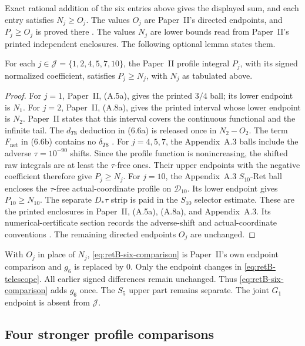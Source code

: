 Exact rational addition of the six entries above gives the displayed
sum, and each entry satisfies $N_j\ge O_j$.
The values $O_j$ are Paper~II's directed endpoints, and $P_j\ge O_j$ is
proved there \cite[(A.4), (A.5a), (A.8), (A.8a), Appendix~A.2--A.6]{PaperII}.
The values $N_j$ are lower bounds read from Paper~II's printed independent
enclosures. The following optional lemma states them.
\begin{lemma}
\label{lem:retB-six-endpoints}
For each $j\in\mathcal J=\{1,2,4,5,7,10\}$, the Paper~II profile integral
$P_j$, with its signed normalized coefficient, satisfies $P_j\ge N_j$,
with $N_j$ as tabulated above.
\end{lemma}
\begin{proof}
For $j=1$, Paper~II, (A.5a), gives the printed $3/4$ ball; its lower endpoint
is $N_1$. For $j=2$, Paper~II, (A.8a), gives the printed interval whose
lower endpoint is $N_2$. Paper~II states that this interval covers the continuous functional and the infinite
tail. The $d_{T8}$ deduction in (6.6a) is released once in $N_2-O_2$.
The term $F_{\mathrm{net}}$ in (6.6b) contains no $\delta_{T8}$
\cite[(6.6a)--(6.6b)]{PaperII}. For $j=4,5,7$, the Appendix~A.3 balls
include the adverse $\tau=10^{-90}$ shifts. Since the profile function is
nonincreasing, the shifted raw integrals are at least the $\tau$-free ones.
Their upper endpoints with the negative coefficient therefore give
$P_j\ge N_j$. For $j=10$, the Appendix~A.3 $S_{10}$-Ret ball encloses the
$\tau$-free actual-coordinate profile on $\mathcal D_{10}$. Its lower
endpoint gives $P_{10}\ge N_{10}$. The separate $D_*\tau$ strip is paid in
the $S_{10}$ selector estimate. These are the printed enclosures in Paper~II,
(A.5a), (A.8a), and Appendix~A.3. Its numerical-certificate section records
the adverse-shift and actual-coordinate conventions
\cite[(A.5a), (A.8a), Appendix~A.3]{PaperII}. The remaining directed
endpoints $O_j$ are unchanged.
\end{proof}
With $O_j$ in place of $N_j$, \eqref{eq:retB-six-comparison} is
Paper~II's own endpoint comparison and $g_6$ is replaced by $0$.
Only the endpoint changes in \eqref{eq:retB-telescope}.
All earlier signed differences remain unchanged.
Thus \eqref{eq:retB-six-comparison} adds $g_6$ once.
The $S_5$ upper part remains separate.
The joint $G_1$ endpoint is absent from $\mathcal J$.

\subsection{Four stronger profile comparisons}

